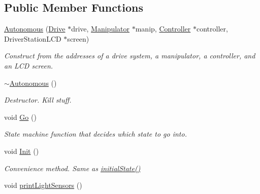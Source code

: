 \subsection*{Public Member Functions}
\begin{DoxyCompactItemize}
\item 
\hyperlink{class_r_j_f_r_c2011_1_1_autonomous_a4be836215225fd5e28546c8fc581437e}{Autonomous} (\hyperlink{class_r_j_f_r_c2011_1_1_drive}{Drive} $\ast$drive, \hyperlink{class_r_j_f_r_c2011_1_1_manipulator}{Manipulator} $\ast$manip, \hyperlink{class_r_j_f_r_c2011_1_1_controller}{Controller} $\ast$controller, DriverStationLCD $\ast$screen)
\begin{DoxyCompactList}\small\item\em Construct from the addresses of a drive system, a manipulator, a controller, and an LCD screen. \item\end{DoxyCompactList}\item 
\hypertarget{class_r_j_f_r_c2011_1_1_autonomous_aa0c7b6f95a793d94aa0fc88d05d24141}{
\hyperlink{class_r_j_f_r_c2011_1_1_autonomous_aa0c7b6f95a793d94aa0fc88d05d24141}{$\sim$Autonomous} ()}
\label{class_r_j_f_r_c2011_1_1_autonomous_aa0c7b6f95a793d94aa0fc88d05d24141}

\begin{DoxyCompactList}\small\item\em Destructor. Kill stuff. \item\end{DoxyCompactList}\item 
void \hyperlink{class_r_j_f_r_c2011_1_1_autonomous_a5840525ab84532ad9bcfaf7996c3a728}{Go} ()
\begin{DoxyCompactList}\small\item\em State machine function that decides which state to go into. \item\end{DoxyCompactList}\item 
\hypertarget{class_r_j_f_r_c2011_1_1_autonomous_a1e3b6d38df0786ccf7f938d60e386aae}{
void \hyperlink{class_r_j_f_r_c2011_1_1_autonomous_a1e3b6d38df0786ccf7f938d60e386aae}{Init} ()}
\label{class_r_j_f_r_c2011_1_1_autonomous_a1e3b6d38df0786ccf7f938d60e386aae}

\begin{DoxyCompactList}\small\item\em Convenience method. Same as {\itshape \hyperlink{class_r_j_f_r_c2011_1_1_autonomous_ac23ae3c557b0a664d5f079b16c6f58df}{initialState()}\/} \item\end{DoxyCompactList}\item 
\hypertarget{class_r_j_f_r_c2011_1_1_autonomous_a37e5a030f02ca1e9377aad232ea7f515}{
void \hyperlink{class_r_j_f_r_c2011_1_1_autonomous_a37e5a030f02ca1e9377aad232ea7f515}{printLightSensors} ()}
\label{class_r_j_f_r_c2011_1_1_autonomous_a37e5a030f02ca1e9377aad232ea7f515}


\end{DoxyCompactItemize}
